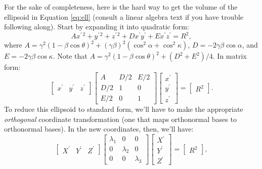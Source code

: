\documentclass[12pt]{article}
\begin{document}
For the sake of completeness, here is the hard way to get the volume of the ellipsoid in Equation \ref{eq:ell} (consult a linear algebra text if you have trouble following along). Start by expanding it into quadratic form:
\begin{equation*}
Ax^{\prime \, 2} + y^{\prime \, 2} + z^{\prime \, 2} + D x^\prime y^\prime + E x^\prime z^\prime = R^2,
\end{equation*}
where $A = \gamma^2 (1 - \beta \cos \theta)^2 + (\gamma \beta)^2 ( \cos^2 \alpha + \cos^2 \kappa )$, $D = -2 \gamma \beta \cos \alpha$, and $E = -2 \gamma \beta \cos \kappa$. Note that $A = \gamma^2 (1 - \beta \cos \theta)^2 + (D^2 + E^2)/4$. In matrix form:
\begin{equation}\label{eq:ellm}
\begin{bmatrix}
x^\prime & y^\prime & z^\prime
\end{bmatrix}
\begin{bmatrix}
A & D/2 & E/2 \\
D/2 & 1 & 0 \\
E/2 & 0 & 1
\end{bmatrix}
\begin{bmatrix}
x^\prime \\
y^\prime \\
z^\prime
\end{bmatrix}
= \begin{bmatrix} R^2 \end{bmatrix} .
\end{equation}
To reduce this ellipsoid to standard form, we'll have to make the appropriate \emph{orthogonal} coordinate transformation (one that maps orthonormal bases to orthonormal bases). In the new coordinates, then, we'll have:
\begin{equation*}
\begin{bmatrix}
X^\prime & Y^\prime & Z^\prime
\end{bmatrix}
\begin{bmatrix}
\lambda_1 & 0 & 0 \\
0 & \lambda_2 & 0 \\
0 & 0 & \lambda_3
\end{bmatrix}
\begin{bmatrix}
X^\prime \\
Y^\prime \\
Z^\prime
\end{bmatrix}
= \begin{bmatrix} R^2 \end{bmatrix} ,
\end{equation*}
\end{document}
